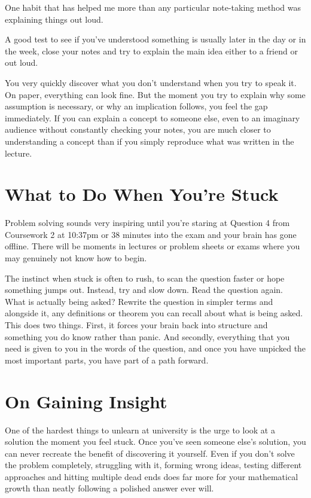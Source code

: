 One habit that has helped me more than any particular note-taking method was explaining things out loud. 

A good test to see if you've understood something is usually later in the day or in the week, close your notes and try to explain the main idea either to a friend or out loud. 

You very quickly discover what you don't understand when you try to speak it. On paper, everything can look fine. But the moment you try to explain why some assumption is necessary, or why an implication follows, you feel the gap immediately. If you can explain a concept to someone else, even to an imaginary audience without constantly checking your notes, you are much closer to understanding a concept than if you simply reproduce what was written in the lecture. 
 

\section{What to Do When You're Stuck}

Problem solving sounds very inspiring until you're staring at Question 4 from Coursework 2 at 10:37pm or 38 minutes into the exam and your brain has gone offline. There will be moments in lectures or problem sheets or exams where you may genuinely not know how to begin. 

The instinct when stuck is often to rush, to scan the question faster or hope something jumps out. Instead, try and slow down. Read the question again. What is actually being asked? Rewrite the question in simpler terms and alongside it, any definitions or theorem you can recall about what is being asked. This does two things. First, it forces your brain back into structure and something you do know rather than panic. And secondly, everything that you need is given to you in the words of the question, and once you have unpicked the most important parts, you have part of a path forward. 

\section{On Gaining Insight}
One of the hardest things to unlearn at university is the urge to look at a solution the moment you feel stuck. Once you've seen someone else's solution, you can never recreate the benefit of discovering it yourself. Even if you don't solve the problem completely, struggling with it, forming wrong ideas, testing different approaches and hitting multiple dead ends does far more for your mathematical growth than neatly following a polished answer ever will.

